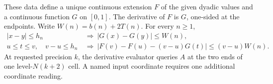 \begin{theorem}\label{thm:dd}
These data define a unique continuous extension $F$ of the given dyadic values and a continuous function $G$ on $[0,1]$. The derivative of $F$ is $G$, one-sided at the endpoints. Write $W(n)=b(n)+2T(n)$. For every $n\ge1$,
\begin{align}
 |x-y|\le h_n &\ \Longrightarrow\ |G(x)-G(y)|\le W(n), \label{eq:dd-mod}\\
 u\le t\le v,\quad v-u\le h_n
 &\ \Longrightarrow\ |F(v)-F(u)-(v-u)G(t)|\le(v-u)W(n).
 \label{eq:dd-cell}
\end{align}
At requested precision $k$, the derivative evaluator queries $A$ at the two ends of one level-$N(k+2)$ cell. A named input coordinate requires one additional coordinate reading.
\end{theorem}

